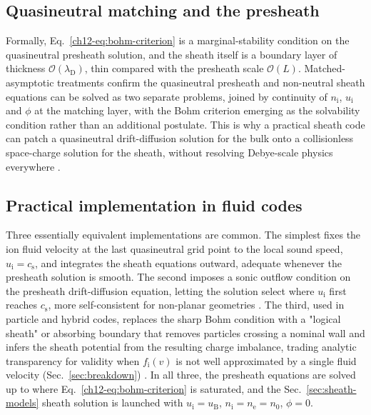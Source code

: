 \subsection{Quasineutral matching and the presheath}

Formally, Eq.~\eqref{ch12-eq:bohm-criterion} is a marginal-stability condition on the quasineutral presheath solution, and the sheath itself is a boundary layer of thickness $\mathcal{O}(\lambda_{\mathrm{D}})$, thin compared with the presheath scale $\mathcal{O}(L)$. Matched-asymptotic treatments confirm the quasineutral presheath and non-neutral sheath equations can be solved as two separate problems, joined by continuity of $n_{\mathrm{i}}$, $u_{\mathrm{i}}$ and $\phi$ at the matching layer, with the Bohm criterion emerging as the solvability condition rather than an additional postulate. This is why a practical sheath code can patch a quasineutral drift-diffusion solution for the bulk onto a collisionless space-charge solution for the sheath, without resolving Debye-scale physics everywhere \cite{ref0012}.

\subsection{Practical implementation in fluid codes}

Three essentially equivalent implementations are common. The simplest fixes the ion fluid velocity at the last quasineutral grid point to the local sound speed, $u_{\mathrm{i}} = c_{\mathrm{s}}$, and integrates the sheath equations outward, adequate whenever the presheath solution is smooth. The second imposes a sonic outflow condition on the presheath drift-diffusion equation, letting the solution select where $u_{\mathrm{i}}$ first reaches $c_{\mathrm{s}}$, more self-consistent for non-planar geometries \cite{ref0013}. The third, used in particle and hybrid codes, replaces the sharp Bohm condition with a "logical sheath" or absorbing boundary that removes particles crossing a nominal wall and infers the sheath potential from the resulting charge imbalance, trading analytic transparency for validity when $f_{\mathrm{i}}(v)$ is not well approximated by a single fluid velocity (Sec.~\ref{sec:breakdown}) \cite{ref0659}. In all three, the presheath equations are solved up to where Eq.~\eqref{ch12-eq:bohm-criterion} is saturated, and the Sec.~\ref{sec:sheath-models} sheath solution is launched with $u_{\mathrm{i}}=u_{\mathrm{B}}$, $n_{\mathrm{i}}=n_{\mathrm{e}}=n_0$, $\phi=0$.

